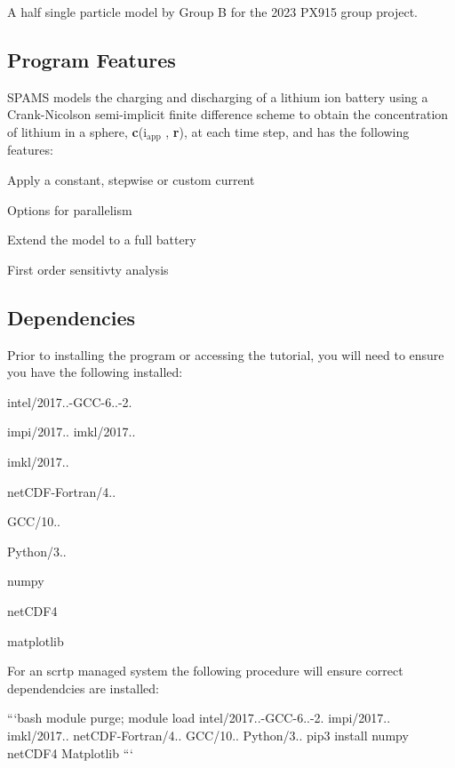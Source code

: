 A half single particle model by Group B for the 2023 P\-X915 group project.

\subsection*{Program Features}

S\-P\-A\-M\-S models the charging and discharging of a lithium ion battery using a Crank-\/\-Nicolson semi-\/implicit finite difference scheme to obtain the concentration of lithium in a sphere, {\bfseries c}(i$_{\mbox{app}}$ , {\bfseries r}), at each time step, and has the following features\-:
\begin{DoxyItemize}
\item Apply a constant, stepwise or custom current
\item Options for parallelism
\item Extend the model to a full battery
\item First order sensitivty analysis
\end{DoxyItemize}

\subsection*{Dependencies}

Prior to installing the program or accessing the tutorial, you will need to ensure you have the following installed\-:


\begin{DoxyItemize}
\item intel/2017..-\/\-G\-C\-C-\/6..-\/2.
\item impi/2017.. imkl/2017..
\item imkl/2017..
\item net\-C\-D\-F-\/\-Fortran/4..
\item G\-C\-C/10..
\item Python/3..
\item numpy
\item net\-C\-D\-F4
\item matplotlib
\end{DoxyItemize}

For an scrtp managed system the following procedure will ensure correct dependendcies are installed\-:

```bash module purge; module load intel/2017..-\/\-G\-C\-C-\/6..-\/2. impi/2017.. imkl/2017.. net\-C\-D\-F-\/\-Fortran/4.. G\-C\-C/10.. Python/3.. pip3 install numpy net\-C\-D\-F4 Matplotlib ```


